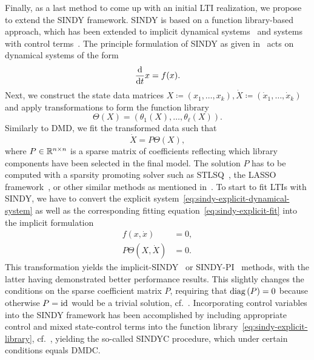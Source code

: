 Finally, as a last method to come up with an initial \ac{LTI} realization, we propose to extend the \ac{SINDY} framework.
\ac{SINDY} is based on a function library-based approach, which has been extended to implicit dynamical systems~\cite{Mangan2016, Kaheman2020} and systems with control terms~\cite{Kaiser2018}.
The principle formulation of \ac{SINDY} as given in~\cite{Brunton2016} acts on dynamical systems of the form
\begin{equation}\label{eq:sindy-explicit-dynamical-system}
    \frac{\mathop{}\!\mathrm{d}}{\mathop{}\!\mathrm{d} t} x = f(x).
\end{equation}
Next, we construct the state data matrices $X \coloneqq (x_1, \dots, x_k), \dot{X} \coloneqq (\dot{x}_1, \dots, \dot{x}_k)$ and apply transformations to form the function library
\begin{equation}\label{eq:sindy-explicit-library}
    \Theta(X) = (\theta_1(X), \dots, \theta_\ell(X)).
\end{equation}
Similarly to \ac{DMD}, we fit the transformed data such that
\begin{equation}\label{eq:sindy-explicit-fit}
    \dot{X} = P \Theta(X),
\end{equation}
where $P \in \mathbb{R}^{n \times n}$ is a sparse matrix of coefficients reflecting which library components have been selected in the final model.
The solution $P$ has to be computed with a sparsity promoting solver such as \ac{STLSQ}~\cite{Zhang2019}, the LASSO framework~\cite{Tibshirani1996}, or other similar methods as mentioned in~\cite{Kaiser2018, Kaheman2020}.
To start to fit \acp{LTI} with \ac{SINDY}, we have to convert the explicit system~\eqref{eq:sindy-explicit-dynamical-system} as well as the corresponding fitting equation~\eqref{eq:sindy-explicit-fit} into the implicit formulation
\begin{equation}\label{eq:sindy-implicit-equations}
    \begin{aligned}
        f(x, \dot{x}) &= 0, \\
        P \Theta(X, \dot{X}) &= 0.
    \end{aligned}
\end{equation}
This transformation yields the implicit-\ac{SINDY}~\cite{Mangan2016} or \ac{SINDY-PI}~\cite{Kaheman2020} methods, with the latter having demonstrated better performance results.
This slightly changes the conditions on the sparse coefficient matrix $P$, requiring that $\mathop{}\!\mathrm{diag}\left(P\right) = 0$ because otherwise $P = \text{id}_{}$ would be a trivial solution, cf.~\cite[Section~3~(b)]{Kaheman2020}.
Incorporating control variables into the \ac{SINDY} framework has been accomplished by including appropriate control and mixed state-control terms into the function library~\eqref{eq:sindy-explicit-library}, cf.~\cite{Kaiser2018}, yielding the so-called \ac{SINDYC} procedure, which under certain conditions equals \ac{DMDC}.
